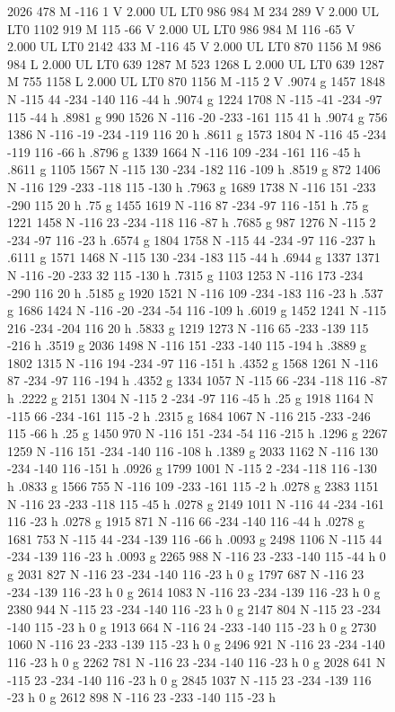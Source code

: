 \documentclass{LMCS}
\begin{document}
\begin{figure}[!tbp]
\begin{minipage}[b]{.47\linewidth}
{{{2026 478 M
-116 1 V
2.000 UL
LT0
986 984 M
234 289 V
2.000 UL
LT0
1102 919 M
115 -66 V
2.000 UL
LT0
986 984 M
116 -65 V
2.000 UL
LT0
2142 433 M
-116 45 V
2.000 UL
LT0
870 1156 M
986 984 L
2.000 UL
LT0
639 1287 M
523 1268 L
2.000 UL
LT0
639 1287 M
755 1158 L
2.000 UL
LT0
870 1156 M
-115 2 V
.9074 g 1457 1848 N -115 44 -234 -140 116 -44 h
.9074 g 1224 1708 N -115 -41 -234 -97 115 -44 h
.8981 g 990 1526 N -116 -20 -233 -161 115 41 h
.9074 g 756 1386 N -116 -19 -234 -119 116 20 h
.8611 g 1573 1804 N -116 45 -234 -119 116 -66 h
.8796 g 1339 1664 N -116 109 -234 -161 116 -45 h
.8611 g 1105 1567 N -115 130 -234 -182 116 -109 h
.8519 g 872 1406 N -116 129 -233 -118 115 -130 h
.7963 g 1689 1738 N -116 151 -233 -290 115 20 h
.75 g 1455 1619 N -116 87 -234 -97 116 -151 h
.75 g 1221 1458 N -116 23 -234 -118 116 -87 h
.7685 g 987 1276 N -115 2 -234 -97 116 -23 h
.6574 g 1804 1758 N -115 44 -234 -97 116 -237 h
.6111 g 1571 1468 N -115 130 -234 -183 115 -44 h
.6944 g 1337 1371 N -116 -20 -233 32 115 -130 h
.7315 g 1103 1253 N -116 173 -234 -290 116 20 h
.5185 g 1920 1521 N -116 109 -234 -183 116 -23 h
.537 g 1686 1424 N -116 -20 -234 -54 116 -109 h
.6019 g 1452 1241 N -115 216 -234 -204 116 20 h
.5833 g 1219 1273 N -116 65 -233 -139 115 -216 h
.3519 g 2036 1498 N -116 151 -233 -140 115 -194 h
.3889 g 1802 1315 N -116 194 -234 -97 116 -151 h
.4352 g 1568 1261 N -116 87 -234 -97 116 -194 h
.4352 g 1334 1057 N -115 66 -234 -118 116 -87 h
.2222 g 2151 1304 N -115 2 -234 -97 116 -45 h
.25 g 1918 1164 N -115 66 -234 -161 115 -2 h
.2315 g 1684 1067 N -116 215 -233 -246 115 -66 h
.25 g 1450 970 N -116 151 -234 -54 116 -215 h
.1296 g 2267 1259 N -116 151 -234 -140 116 -108 h
.1389 g 2033 1162 N -116 130 -234 -140 116 -151 h
.0926 g 1799 1001 N -115 2 -234 -118 116 -130 h
.0833 g 1566 755 N -116 109 -233 -161 115 -2 h
.0278 g 2383 1151 N -116 23 -233 -118 115 -45 h
.0278 g 2149 1011 N -116 44 -234 -161 116 -23 h
.0278 g 1915 871 N -116 66 -234 -140 116 -44 h
.0278 g 1681 753 N -115 44 -234 -139 116 -66 h
.0093 g 2498 1106 N -115 44 -234 -139 116 -23 h
.0093 g 2265 988 N -116 23 -233 -140 115 -44 h
0 g 2031 827 N -116 23 -234 -140 116 -23 h
0 g 1797 687 N -116 23 -234 -139 116 -23 h
0 g 2614 1083 N -116 23 -234 -139 116 -23 h
0 g 2380 944 N -115 23 -234 -140 116 -23 h
0 g 2147 804 N -115 23 -234 -140 115 -23 h
0 g 1913 664 N -116 24 -233 -140 115 -23 h
0 g 2730 1060 N -116 23 -233 -139 115 -23 h
0 g 2496 921 N -116 23 -234 -140 116 -23 h
0 g 2262 781 N -116 23 -234 -140 116 -23 h
0 g 2028 641 N -115 23 -234 -140 116 -23 h
0 g 2845 1037 N -115 23 -234 -139 116 -23 h
0 g 2612 898 N -116 23 -233 -140 115 -23 h
}}}
\end{minipage}
\end{figure}
\end{document}
